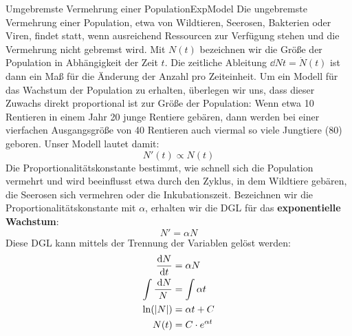 \begin{example}{Umgebremste Vermehrung einer Population}{ExpModel}
    Die ungebremste Vermehrung einer Population, etwa von Wildtieren, Seerosen, Bakterien oder Viren, findet statt, wenn ausreichend Ressourcen zur Verfügung stehen und die Vermehrung nicht gebremst wird. Mit $N(t)$ bezeichnen wir die Größe der Population in Abhängigkeit der Zeit $t$. Die zeitliche Ableitung $\dd{N}{t} = \dot{N}(t)$ ist dann ein Maß für die Änderung der Anzahl pro Zeiteinheit. Um ein Modell für das Wachstum der Population zu erhalten, überlegen wir uns, dass dieser Zuwachs direkt proportional ist zur Größe der Population: Wenn etwa 10 Rentieren in einem Jahr 20 junge Rentiere gebären, dann werden bei einer vierfachen Ausgangsgröße von 40 Rentieren auch viermal so viele Jungtiere (80) geboren. Unser Modell lautet damit:
    $$
        N'(t) \propto N(t)
    $$
    Die Proportionalitätskonstante bestimmt, wie schnell sich die Population vermehrt und wird beeinflusst etwa durch den Zyklus, in dem Wildtiere gebären, die Seerosen sich vermehren oder die Inkubationszeit. Bezeichnen wir die Proportionalitätskonstante mit $\alpha$, erhalten wir die DGL für das \textbf{exponentielle Wachstum}:
    $$
        N' = \alpha N
    $$
    Diese DGL kann mittels der Trennung der Variablen gelöst werden:
    \begin{alignat*}{1}
        \frac{\mathrm{d}{N}}{\mathrm{d}{t}}               &= \alpha N \\
        \int \frac{\:\mathrm{d}{N}}{N} &= \int \alpha t \\
        \ln(|N|)                &= \alpha t + C \\
        N(t)                    &= C \cdot e^{\alpha t}
    \end{alignat*}
\end{example}

